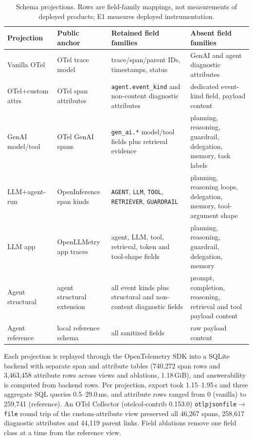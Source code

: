 \documentclass[conference]{IEEEtran}
\begin{document}
\begin{table}[t]
\centering
\scriptsize
\caption{Schema projections. Rows are field-family mappings, not
measurements of deployed products; E1 measures deployed instrumentation.}
\label{tab:projections}
\begin{tabular}{@{}p{}p{}p{}p{}@{}}
\toprule
Projection & Public anchor & Retained field families & Absent field families \\
\midrule
Vanilla OTel & OTel trace model & trace/span/parent IDs, timestamps, status & GenAI and agent diagnostic attributes \\
OTel+custom attrs & OTel span attributes & \texttt{agent.event\_kind} and non-content diagnostic attributes & dedicated event-kind field, payload content \\
GenAI model/tool & OTel GenAI spans & \texttt{gen\_ai.*} model/tool fields plus retrieval evidence & planning, reasoning, guardrail, delegation, memory, task labels \\
LLM+agent-run & OpenInference span kinds & \texttt{AGENT}, \texttt{LLM}, \texttt{TOOL}, \texttt{RETRIEVER}, \texttt{GUARDRAIL} & planning, reasoning loops, delegation, memory, tool-argument shape \\
LLM app & OpenLLMetry app traces & agent, LLM, tool, retrieval, token and tool-shape fields & planning, reasoning, guardrail, delegation, memory \\
Agent structural & agent structural extension & all event kinds plus structural and non-content diagnostic fields & prompt, completion, reasoning, retrieval and tool payload content \\
Agent reference & local reference schema & all sanitized fields & raw payload content \\
\bottomrule
\end{tabular}
\end{table}

Each projection is replayed through the OpenTelemetry SDK into a SQLite
backend with separate span and attribute tables (740,272 span rows and
3,463,458 attribute rows across views and ablations, 1.18\,GiB), and
answerability is computed from backend rows. Per projection, export took
1.15--1.95\,s and three aggregate SQL queries 0.5--29.0\,ms, and attribute
rows ranged from 0 (vanilla) to 259,741 (reference). An OTel Collector
(otelcol-contrib 0.153.0) \texttt{otlpjsonfile}$\rightarrow$\texttt{file}
round trip of the custom-attribute view preserved all 46,267 spans,
258,617 diagnostic attributes and 44,119 parent links. Field ablations
remove one field class at a time from the reference view.
\end{document}
